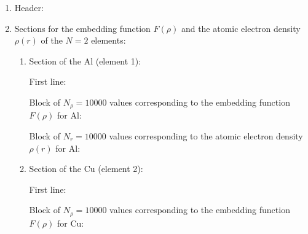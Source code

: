 \documentclass{article}
\begin{document}
	\begin{enumerate}
		\item Header:
		\lstset{style=mystyle}
		\item  Sections for the embedding function $F(\rho)$ and the atomic electron density $\rho(r)$ of the $N=2$ elements:
		
		
		\begin{enumerate}
			\item Section of the Al (element 1):
			
			First line:
			
			Block of $N_{\rho}=10000$ values corresponding to the embedding function $F(\rho)$ for Al:
			
			Block of $N_{r}=10000$ values corresponding to the atomic electron density $\rho(r)$ for Al:
			
			\item Section of the Cu (element 2):
			
			First line:
			
			Block of $N_{\rho}=10000$ values corresponding to the embedding function $F(\rho)$ for Cu:
			

\end{enumerate}
\end{enumerate}
\end{document}
